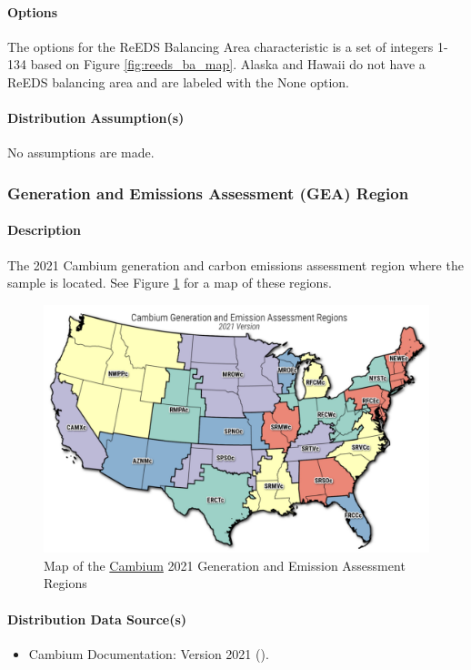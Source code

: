 \paragraph{Options}
The options for the ReEDS Balancing Area characteristic is a set of integers 1-134 based on Figure \ref{fig:reeds_ba_map}. Alaska and Hawaii do not have a ReEDS balancing area and are labeled with the None option.
\paragraph{Distribution Assumption(s)}
No assumptions are made.

\subsubsection{Generation and Emissions Assessment (GEA) Region}
\paragraph{Description}
The 2021 Cambium generation and carbon emissions assessment region where the sample is located. See Figure \ref{fig:cambium_gea_map} for a map of these regions.

\begin{figure}
    \centering
    \includegraphics[width=1\linewidth]{images/Cambium_GEAs_2021.png}
    \caption{ Map of the \href{https://www.nrel.gov/analysis/cambium.html}{Cambium} 2021 Generation and Emission Assessment Regions}
    \label{fig:cambium_gea_map}
\end{figure}

\paragraph{Distribution Data Source(s)}
\begin{itemize}
    \item Cambium Documentation: Version 2021 (\cite{Gagnon2021}).

\end{itemize}

